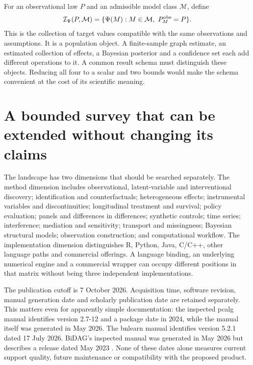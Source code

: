 For an observational law $P$ and an admissible model class $\mathcal M$, define
\begin{equation}
 \mathcal I_\Psi(P,\mathcal M)
 =\{\Psi(M):M\in\mathcal M,\ P_M^{\rm obs}=P\}.
 \label{exec13:identified-set}
\end{equation}
This is the collection of target values compatible with the same observations
and assumptions. It is a population object. A finite-sample graph estimate,
an estimated collection of effects, a Bayesian posterior and a confidence set
each add different operations to it. A common result schema must distinguish
these objects. Reducing all four to a scalar and two bounds would make the
schema convenient at the cost of its scientific meaning.

\section{A bounded survey that can be extended without changing its claims}

The landscape has two dimensions that should be searched separately. The
method dimension includes observational, latent-variable and interventional
discovery; identification and counterfactuals; heterogeneous effects;
instrumental variables and discontinuities; longitudinal treatment and survival;
policy evaluation; panels and differences in differences; synthetic controls;
time series; interference; mediation and sensitivity; transport and missingness;
Bayesian structural models; observation construction; and computational
workflow. The implementation dimension distinguishes R, Python, Java,
C/C++, other language paths and commercial offerings. A language binding,
an underlying numerical engine and a commercial wrapper can occupy different
positions in that matrix without being three independent implementations.

The publication cutoff is 7 October 2026. Acquisition time, software revision,
manual generation date and scholarly publication date are retained separately.
This matters even for apparently simple documentation: the inspected pcalg
manual identifies version 2.7-12 and a package date in 2024, while the manual
itself was generated in May 2026. The bnlearn manual identifies version 5.2.1
dated 17 July 2026. BiDAG's inspected manual was generated in May 2026 but
describes a release dated May 2023
\citep{exec13_pcalg,exec13_bnlearn,exec13_bidag}. None of these dates alone
measures current support quality, future maintenance or compatibility with
the proposed product.

